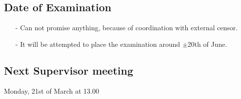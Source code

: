 \subsection{Date of Examination}
\begin{itemize}
\item[-] Can not promise anything, because of coordination with external censor.
\item[-] It will be attempted to place the examination around $\pm$20th of June.
\end{itemize}

\subsection{Next Supervisor meeting}
Monday, 21st of March at 13.00

